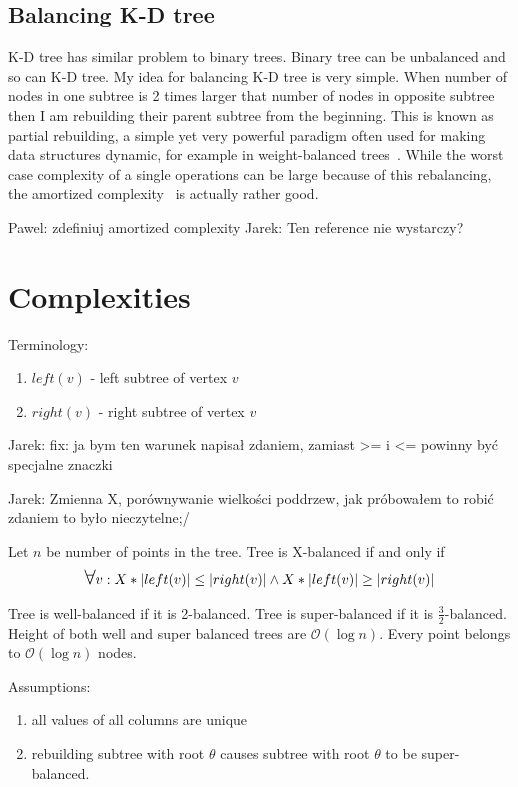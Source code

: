 \documentclass[10pt,a4paper]{article}
\newcommand{\pawel}[1]{\noindent\colorbox{myRed}{Pawel: #1}}
\newcommand{\jarek}[1]{\noindent\colorbox{myYellow}{Jarek: #1}}
\newcommand{\Oh}{\mathcal{O}}
\newcommand\bigforall{\mbox{\Large $\mathsurround0pt\forall$}}
\begin{document}
\subsection{Balancing K-D tree}
K-D tree has similar problem to binary trees. Binary tree can be unbalanced and so can K-D tree. My idea for balancing K-D tree is very simple. When number of nodes in one subtree is 2 times larger that number of nodes in opposite subtree then I am rebuilding their parent subtree from the beginning.
This is known as partial rebuilding, a simple yet very powerful paradigm often used for making data structures dynamic, for example in weight-balanced trees~\cite{ALPHATREES}. While the worst case complexity of a single operations can be large because of this rebalancing, the amortized complexity~\cite{AMOR} is actually rather good.

\pawel{zdefiniuj amortized complexity}
\jarek{Ten reference nie wystarczy?}


\section{Complexities}

Terminology:
\begin{enumerate}
\item $left(v)$ - left subtree of vertex $v$
\item $right(v)$ - right subtree of vertex $v$
\end{enumerate}

\jarek{fix: ja bym ten warunek napisał zdaniem, zamiast >= i <= powinny być specjalne znaczki}

\jarek{Zmienna X, porównywanie wielkości poddrzew, jak próbowałem to robić zdaniem to było nieczytelne;/}

Let $n$ be number of points in the tree. Tree is X-balanced if and only if 
\begin{eqnarray*}
\bigforall v: X * |left(v)| \leq |right(v)| \wedge X * |left(v)| \geq |right(v)|
\end{eqnarray*}

Tree is well-balanced if it is 2-balanced. Tree is super-balanced if it is  $\frac{3}{2}$-balanced. Height of both well and super balanced trees are $\Oh(\log n)$. Every point belongs to $\Oh(\log n)$ nodes. 

Assumptions:
\begin{enumerate}
\item all values of all columns are unique
\item rebuilding subtree with root $\theta$ causes subtree with root $\theta$ to be super-balanced.
\end{enumerate}
\end{document}
